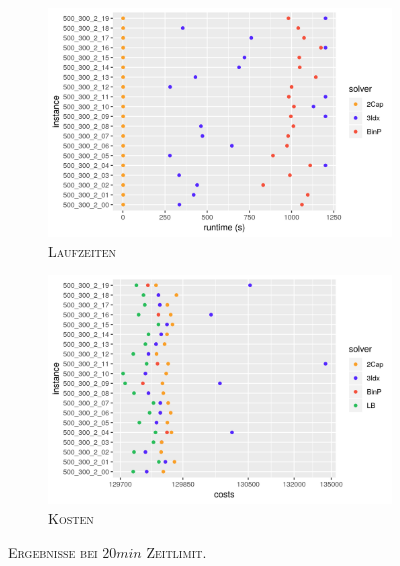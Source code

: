 \begin{figure}[H]
\centering
\begin{subfigure}[b]{0.47\textwidth}
\centering
\includegraphics[width=1.1\textwidth]{img/solver_instance_time_b=2_l_1200s.png}
\caption{\textsc{Laufzeiten}}
\label{fig:b=2_l_runtimes}
\end{subfigure}
\hfill
\begin{subfigure}[b]{0.47\textwidth}
\centering
\includegraphics[width=1.1\textwidth]{img/solver_instance_cost_b=2_l_1200s.png}
\caption{\textsc{Kosten}}
\label{fig:b=2_l_costs}
\end{subfigure}
\caption{\textsc{Ergebnisse bei $20min$ Zeitlimit}.}
\label{fig:res_plots_b=2_l}
\end{figure}

